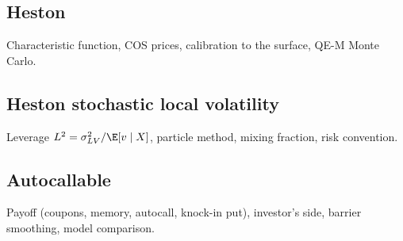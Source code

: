 \pending

\subsection{Heston}\label{sec:mp-heston}
Characteristic function, COS prices, calibration to the surface, QE-M Monte Carlo.

\pending

\subsection{Heston stochastic local volatility}\label{sec:mp-slv}
Leverage $L^2 = \sigma_{LV}^2 / \E[v \mid X]$, particle method, mixing fraction, risk convention.

\pending

\subsection{Autocallable}\label{sec:mp-autocallable}
Payoff (coupons, memory, autocall, knock-in put), investor's side, barrier smoothing, model comparison.

\pending
